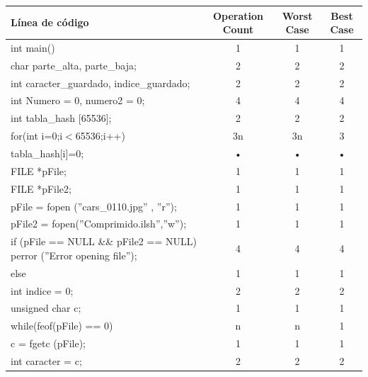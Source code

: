 \documentclass[letterpaper]{article}
\begin{document}
\begin{tabular}{|l|c|c|c|}
\hline 
Línea de código & Operation Count & Worst Case & Best Case \\ 
\hline
int main() & 1 & 1 & 1 \\
\hline 
\hspace{0.5cm} char parte\_{alta}, parte\_{baja}; & 2 & 2 & 2 \\ 
\hline 
\hspace{0.5cm} int caracter\_{guardado}, indice\_{guardado}; & 2 & 2 & 2 \\ 
\hline 
\hspace{0.5cm} int Numero = 0, numero2 = 0; & 4 & 4 & 4 \\ 
\hline 
\hspace{0.5cm} int tabla\_{hash} [65536]; & 2 & 2 & 2 \\ 
\hline 
\hspace{0.5cm} for(int i=0;i$<$65536;i++) & 3n & 3n & 3 \\ 
\hline
\hspace{1cm} tabla\_hash[i]=0; & • & • & • \\ 
\hline
\hspace{0.5cm} FILE *pFile;& 1 & 1 & 1 \\ 
\hline 
\hspace{0.5cm} FILE *pFile2; & 1 & 1 & 1 \\ 
\hline 
\hspace{0.5cm} pFile = fopen (''cars\_0110.jpg'' , ''r''); & 1 & 1 & 1 \\ 
\hline 
\hspace{0.5cm} pFile2 = fopen(''Comprimido.ilsh'',''w''); & 1 & 1 & 1 \\ 
\hline 
\hspace{0.5cm} if (pFile == NULL \&\& pFile2 == NULL) perror (''Error opening file''); & 4 & 4 & 4 \\
\hline  
\hspace{0.5cm} else & 1 & 1 & 1 \\ 
\hline
\hspace{1cm} int indice = 0; & 2 & 2 & 2 \\ 
\hline
\hspace{1cm} unsigned char c; & 1 & 1 & 1 \\ 
\hline
\hspace{1cm} while(feof(pFile) == 0) & n & n & 1 \\ 
\hline
\hspace{1.5cm} c = fgetc (pFile); & 1 & 1 & 1 \\ 
\hline
\hspace{1.5cm} int caracter = c; & 2 & 2 & 2 \\ 

\end{tabular}
\end{document}
